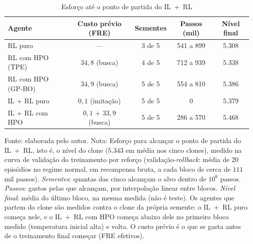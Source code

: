 \begin{table}[htbp]
\centering
\small\setlength{\tabcolsep}{2.5pt}
\caption{Esforço até o ponto de partida do IL~+~RL}
\label{tab:esforco}
\begin{tabular}{l c c c c}
\hline
\textbf{Agente} & \textbf{Custo prévio (FRE)} & \textbf{Sementes} & \textbf{Passos (mil)} & \textbf{Nível final} \\ \hline
RL puro & --- & 3 de 5 & 541 a 899 & 5.308 \\
RL com HPO (TPE) & $34{,}8$ (busca) & 4 de 5 & 712 a 939 & 5.338 \\
RL com HPO (GP-BO) & $34{,}9$ (busca) & 5 de 5 & 554 a 810 & 5.386 \\ \hline
IL + RL puro & $0{,}1$ (imitação) & 5 de 5 & 0 & 5.379 \\
IL + RL com HPO & $0{,}1$ + $33{,}9$ (busca) & 5 de 5 & 286 a 570 & 5.468 \\
\hline
\end{tabular}

{\footnotesize Fonte: elaborada pelo autor. Nota: Esforço para alcançar o ponto de partida do IL~+~RL, isto é, o nível do clone ($5.343$ em média nos cinco clones), medido na curva de validação do treinamento por reforço (validação-\textit{rollback}: média de 20 episódios no regime normal, em recompensa bruta, a cada bloco de cerca de $111$ mil passos). \emph{Sementes}: quantas das cinco alcançam o alvo dentro de $10^6$ passos. \emph{Passos}: gastos pelas que alcançam, por interpolação linear entre blocos. \emph{Nível final}: média do último bloco, na mesma medida (não é teste). Os agentes que partem do clone são medidos contra o clone da própria semente: o IL~+~RL puro começa nele, e o IL~+~RL com HPO começa abaixo dele no primeiro bloco medido (temperatura inicial alta) e volta. O custo prévio é o que se gasta antes de o treinamento final começar (FRE efetivos).}
\end{table}
